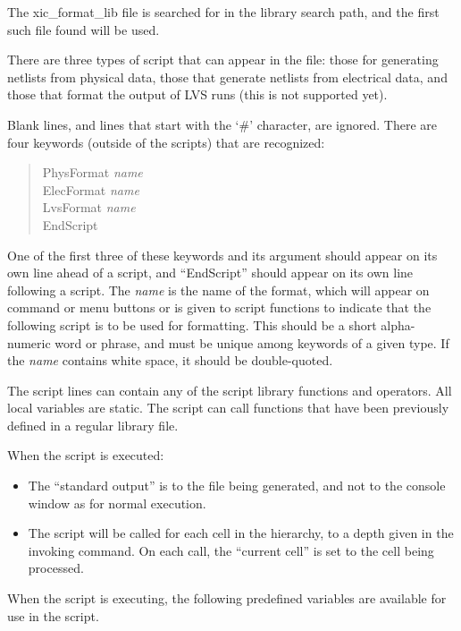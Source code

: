 The {\vt xic\_format\_lib} file is searched for in the library search
path, and the first such file found will be used.

There are three types of script that can appear in the file:  those
for generating netlists from physical data, those that generate
netlists from electrical data, and those that format the output of LVS
runs (this is not supported yet).

Blank lines, and lines that start with the `\#' character, are ignored. 
There are four keywords (outside of the scripts) that are recognized:
\begin{quote}
{\vt PhysFormat} {\it name}\\
{\vt ElecFormat} {\it name}\\
{\vt LvsFormat} {\it name}\\
{\vt EndScript}
\end{quote}

One of the first three of these keywords and its argument should
appear on its own line ahead of a script, and ``{\vt EndScript}''
should appear on its own line following a script.  The {\it name} is
the name of the format, which will appear on command or menu buttons
or is given to script functions to indicate that the following script
is to be used for formatting.  This should be a short alpha-numeric
word or phrase, and must be unique among keywords of a given type.  If
the {\it name} contains white space, it should be double-quoted.

The script lines can contain any of the script library functions and
operators.  All local variables are static.  The script can call
functions that have been previously defined in a regular library file.

When the script is executed:
\begin{itemize}
\item{The ``standard output'' is to the file being generated, and not
 to the console window as for normal execution.}
\item{The script will be called for each cell in the hierarchy, to
 a depth given in the invoking command.  On each call, the ``current
 cell'' is set to the cell being processed.}
\end{itemize}

When the script is executing, the following predefined variables are
available for use in the script.

